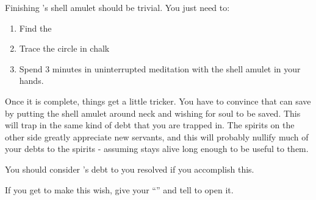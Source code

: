 \documentclass[green]{NeptuneBall}
\begin{document}
\name{\gAmulet{}}

Finishing \cAriel{}'s shell amulet should be trivial. You just need to:
\begin{enumerate}
\item Find the \sRunicCircle{}
\item Trace the circle in chalk
\item Spend 3 minutes in uninterrupted meditation with the shell amulet in your hands. 
\end{enumerate}

Once it is complete, things get a little tricker. You have to convince \cAriel{} that \cAriel{\they} can save \cAriel{\their} \cArielsSon{\offspring} by putting the shell amulet around \cAriel{\their} neck and wishing for \cArielsSon{\their} soul to be saved. This will trap \cAriel{} in the same kind of debt that you are trapped in. The spirits on the other side greatly appreciate new servants, and this will probably nullify much of your debts to the spirits - assuming \cAriel{\they} stays alive long enough to be useful to them. 

You should consider \cAriel{}'s debt to you resolved if you accomplish this.

If you get \cAriel{} to make this wish, give \cAriel{\them} your ``\mMEnvelope{\MYname}'' and tell \cAriel{\them} to open it.
\end{document}
